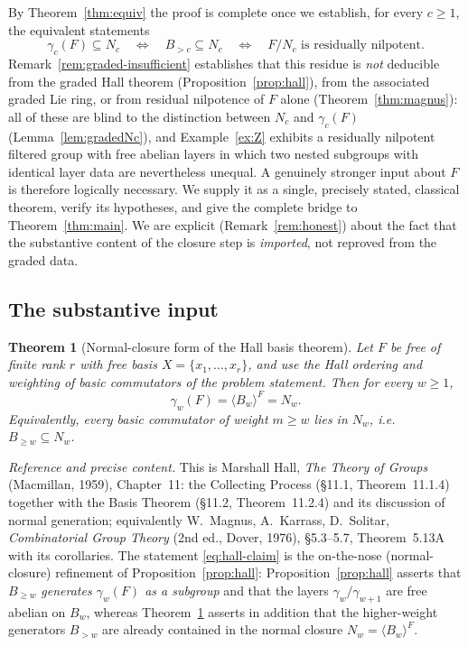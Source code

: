 \documentclass{amsart}
\newtheorem{theorem}{Theorem}
\theoremstyle{definition}
\theoremstyle{remark}
\begin{document}
By Theorem~\ref{thm:equiv} the proof is complete once we establish, for every
$c\ge1$, the equivalent statements
\[
\gamma_c(F)\subseteq N_c
\quad\Longleftrightarrow\quad
B_{>c}\subseteq N_c
\quad\Longleftrightarrow\quad
F/N_c \text{ is residually nilpotent.}
\]
Remark~\ref{rem:graded-insufficient} establishes that this residue is \emph{not}
deducible from the graded Hall theorem (Proposition~\ref{prop:hall}), from the
associated graded Lie ring, or from residual nilpotence of $F$ alone
(Theorem~\ref{thm:magnus}): all of these are blind to the distinction between
$N_c$ and $\gamma_c(F)$ (Lemma~\ref{lem:gradedNc}), and
Example~\ref{ex:Z} exhibits a residually nilpotent filtered group with free
abelian layers in which two nested subgroups with identical layer data are
nevertheless unequal. A genuinely stronger input about $F$ is therefore logically
necessary. We supply it as a single, precisely stated, classical theorem, verify
its hypotheses, and give the complete bridge to Theorem~\ref{thm:main}. We are
explicit (Remark~\ref{rem:honest}) about the fact that the substantive content of
the closure step is \emph{imported}, not reproved from the graded data.

\subsection{The substantive input}

\begin{theorem}[Normal-closure form of the Hall basis theorem]\label{thm:hall-full}
Let $F$ be free of finite rank $r$ with free basis $X=\{x_1,\dots,x_r\}$, and use
the Hall ordering and weighting of basic commutators of the problem statement. Then
for every $w\ge1$,
\begin{equation}\label{eq:hall-claim}
\gamma_w(F)=\langle B_w\rangle^{F}=N_w .
\end{equation}
Equivalently, every basic commutator of weight $m\ge w$ lies in $N_w$, i.e.\
$B_{\ge w}\subseteq N_w$.
\end{theorem}

\noindent
\emph{Reference and precise content.}
This is Marshall Hall, \emph{The Theory of Groups} (Macmillan, 1959),
Chapter~11: the Collecting Process (\S11.1, Theorem~11.1.4) together with the
Basis Theorem (\S11.2, Theorem~11.2.4) and its discussion of normal generation;
equivalently W.\ Magnus, A.\ Karrass, D.\ Solitar, \emph{Combinatorial Group
Theory} (2nd ed., Dover, 1976), \S5.3--5.7, Theorem~5.13A with its corollaries.
The statement \eqref{eq:hall-claim} is the on-the-nose (normal-closure) refinement
of Proposition~\ref{prop:hall}: Proposition~\ref{prop:hall} asserts that $B_{\ge
w}$ \emph{generates $\gamma_w(F)$ as a subgroup} and that the layers
$\gamma_w/\gamma_{w+1}$ are free abelian on $B_w$, whereas
Theorem~\ref{thm:hall-full} asserts in addition that the higher-weight generators
$B_{>w}$ are already contained in the normal closure $N_w=\langle B_w\rangle^F$.
\end{document}

